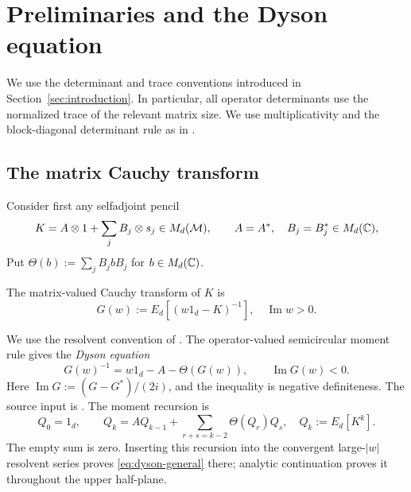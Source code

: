 \section{Preliminaries and the Dyson equation}\label{sec:dyson}


We use the determinant and trace conventions introduced in Section~\ref{sec:introduction}.
In particular, all operator determinants use the normalized trace of the relevant matrix size.
We use multiplicativity and the block-diagonal determinant rule as in \cite[Proposition 2.3]{MS24}.

\subsection{The matrix Cauchy transform}
Consider first any selfadjoint pencil
\[
 K=A\otimes1+\sum_j B_j\otimes s_j\in M_d(\mathcal M),
 \qquad A=A^*,\quad B_j=B_j^*\in M_d(\mathbb C),
\]
Put $\Theta(b):=\sum_jB_jbB_j$ for $b\in M_d(\mathbb C)$.

\begin{definition}\label{def:cauchy-transform}
The matrix-valued Cauchy transform of $K$ is
\[
 G(w):=E_d[(w1_d-K)^{-1}],\quad \operatorname{Im}w>0.
\]
\end{definition}
We use the resolvent convention of \cite[Chapter 9, (9.5)]{MS17}.
The operator-valued semicircular moment rule gives the \emph{Dyson equation}
\begin{equation}\label{eq:dyson-general}
 G(w)^{-1}=w1_d-A-\Theta(G(w)),\qquad \operatorname{Im}G(w)<0.
\end{equation}
Here $\operatorname{Im}G:=(G-G^*)/(2i)$, and the inequality is negative definiteness.
The source input is \cite[Chapter 9, Definition 10, Theorem 11 and Proposition 13]{MS17}.
The moment recursion is
\[
 Q_0=1_d,\qquad Q_k=AQ_{k-1}
       +\sum_{r+s=k-2}\Theta(Q_r)Q_s,\quad Q_k:=E_d[K^k].
\]
The empty sum is zero.
Inserting this recursion into the convergent large-$|w|$ resolvent series proves \eqref{eq:dyson-general} there; analytic continuation proves it throughout the upper half-plane.

